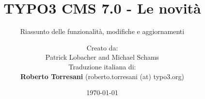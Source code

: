 %

%
%

\documentclass[t]{beamer}

\beamertemplatenavigationsymbolsempty

{
	\usetheme{typo3slides}
}

\title{TYPO3 CMS 7.0 - Le novità}
\subtitle{Riassunto delle funzionalità, modifiche e aggiornamenti}
\author{
	\centerline{Creato da:}
	\centerline{Patrick Lobacher and Michael Schams}
	\vspace{0.4cm}
	\centerline{Traduzione italiana di:}
	\textbf{Roberto Torresani} (roberto.torresani (at) typo3.org)
}

\date{\today}



\sharefont


\begingroup
	[default]
	\begin{frame}
		\titlepage
	\end{frame}
\endgroup



\section*{TYPO3 CMS 7.0 - Le novità}
\begin{frame}[fragile]
	\frametitle{Indice delle sezioni}
	\framesubtitle{Indice delle sezioni}

	\begin{multicols}{2}
		\tableofcontents
	\end{multicols}

\end{frame}

